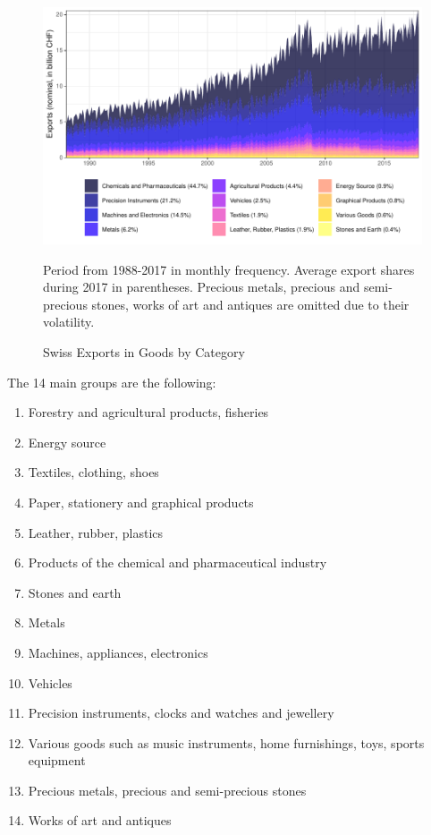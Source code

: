 \documentclass[a4paper,fleqn,11pt]{article}
\begin{document}
\begin{figure}[H]
	\includegraphics[width=\textwidth]{fig/fig_area_cat}
	\caption{Swiss Exports in Goods by Category}
	\footnotesize{Period from 1988-2017 in monthly frequency. Average export shares during 2017 in parentheses. Precious metals, precious and semi-precious stones, works of art and antiques are omitted due to their volatility.}
\end{figure}

 The 14 main groups are the following:
\begin{enumerate}[itemsep=-1ex,partopsep=1ex,parsep=1ex]
    \item Forestry and agricultural products, fisheries
    \item Energy source
    \item Textiles, clothing, shoes
    \item Paper, stationery and graphical products
    \item Leather, rubber, plastics 
    \item Products of the chemical and pharmaceutical industry
    \item Stones and earth
    \item Metals
    \item Machines, appliances, electronics
    \item Vehicles
    \item Precision instruments, clocks and watches and jewellery  
    \item Various goods such as music instruments, home furnishings, toys, sports equipment
    \item Precious metals, precious and semi-precious stones
    \item Works of art and antiques
\end{enumerate}
\end{document}
